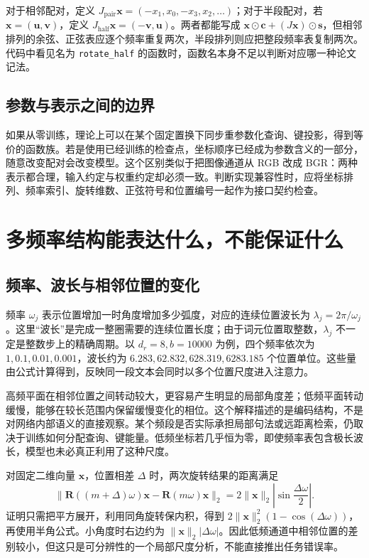 \documentclass[UTF8,12pt,a4paper,fontset=fandol]{ctexart}
\begin{document}
对于相邻配对，定义 $J_{\mathrm{pair}}\mathbf x=(-x_1,x_0,-x_3,x_2,\ldots)$；对于半段配对，若 $\mathbf x=(\mathbf u,\mathbf v)$，定义 $J_{\mathrm{half}}\mathbf x=(-\mathbf v,\mathbf u)$。两者都能写成 $\mathbf x\odot\mathbf c+(J\mathbf x)\odot\mathbf s$，但相邻排列的余弦、正弦表应逐个频率重复两次，半段排列则应把整段频率表复制两次。代码中看见名为 \texttt{rotate\_half} 的函数时，函数名本身不足以判断对应哪一种论文记法。

\subsection{参数与表示之间的边界}
如果从零训练，理论上可以在某个固定置换下同步重参数化查询、键投影，得到等价的函数族。若是使用已经训练的检查点，坐标顺序已经成为参数含义的一部分，随意改变配对会改变模型。这个区别类似于把图像通道从 RGB 改成 BGR：两种表示都合理，输入约定与权重约定却必须一致。判断实现兼容性时，应将坐标排列、频率索引、旋转维数、正弦符号和位置编号一起作为接口契约检查。

\section{多频率结构能表达什么，不能保证什么}
\label{sec:rope-spectrum}

\subsection{频率、波长与相邻位置的变化}
频率 $\omega_j$ 表示位置增加一时角度增加多少弧度，对应的连续位置波长为 $\lambda_j=2\pi/\omega_j$。这里“波长”是完成一整圈需要的连续位置长度；由于词元位置取整数，$\lambda_j$ 不一定是整数步上的精确周期。以 $d_r=8,b=10000$ 为例，四个频率依次为 $1,0.1,0.01,0.001$，波长约为 $6.283,62.832,628.319,6283.185$ 个位置单位。这些量由公式计算得到，反映同一段文本会同时以多个位置尺度进入注意力。

高频平面在相邻位置之间转动较大，更容易产生明显的局部角度差；低频平面转动缓慢，能够在较长范围内保留缓慢变化的相位。这个解释描述的是编码结构，不是对网络内部语义的直接观察。某个频段是否实际承担局部句法或远距离检索，仍取决于训练如何分配查询、键能量。低频坐标若几乎恒为零，即使频率表包含极长波长，模型也未必真正利用了这种尺度。

对固定二维向量 $\mathbf x$，位置相差 $\Delta$ 时，两次旋转结果的距离满足
\begin{equation}
\|\mathbf R((m+\Delta)\omega)\mathbf x-
\mathbf R(m\omega)\mathbf x\|_2
=2\|\mathbf x\|_2\left|\sin\frac{\Delta\omega}{2}\right|.
\label{eq:rope-chord}
\end{equation}
证明只需把平方展开，利用同角旋转保内积，得到 $2\|\mathbf x\|_2^2(1-\cos(\Delta\omega))$，再使用半角公式。小角度时右边约为 $\|\mathbf x\|_2|\Delta\omega|$。因此低频通道中相邻位置的差别较小，但这只是可分辨性的一个局部尺度分析，不能直接推出任务错误率。
\end{document}

